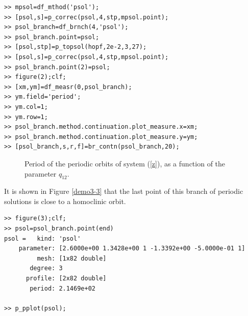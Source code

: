 \documentclass[10pt]{article}
\begin{document}
{{\begin{verbatim}
>> mpsol=df_mthod('psol');
>> [psol,s]=p_correc(psol,4,stp,mpsol.point);
>> psol_branch=df_brnch(4,'psol');
>> psol_branch.point=psol;
>> [psol,stp]=p_topsol(hopf,2e-2,3,27);
>> [psol,s]=p_correc(psol,4,stp,mpsol.point);
>> psol_branch.point(2)=psol;
>> figure(2);clf;
>> [xm,ym]=df_measr(0,psol_branch);
>> ym.field='period';
>> ym.col=1;
>> ym.row=1;
>> psol_branch.method.continuation.plot_measure.x=xm;
>> psol_branch.method.continuation.plot_measure.y=ym;
>> [psol_branch,s,r,f]=br_contn(psol_branch,20);
\end{verbatim}}

\begin{figure}[ht]
\begin{center}
\caption{\small\label{demo3-2}Period of the periodic orbits of system (\ref{z}), as a
 function of the parameter $q_{12}$.}
\end{center}
\end{figure}

It is shown in Figure \ref{demo3-3} that the last point of this branch of periodic solutions is close to a homoclinic orbit.
{\small\begin{verbatim}
>> figure(3);clf;
>> psol=psol_branch.point(end)
psol =   kind: 'psol'
    parameter: [2.6000e+00 1.3428e+00 1 -1.3392e+00 -5.0000e-01 1]
         mesh: [1x82 double]
       degree: 3
      profile: [2x82 double]
       period: 2.1469e+02

>> p_pplot(psol);
\end{verbatim}}

}
\end{document}
